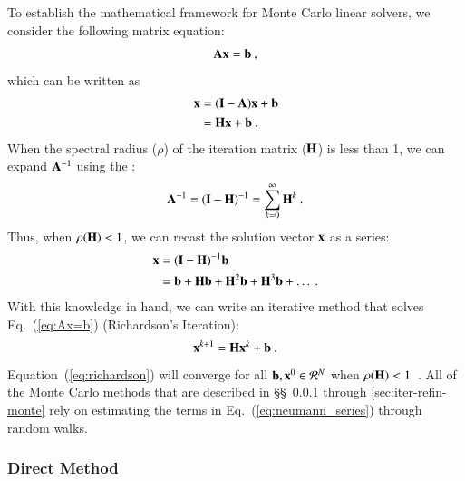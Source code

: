 \documentclass[preprint,12pt]{elsarticle}
\newcommand{\vA}{\ensuremath{\ve{A}}}
\newcommand{\vb}{\ensuremath{\ve{b}}}
\newcommand{\vx}{\ensuremath{\ve{x}}}
\newcommand{\vI}{\ensuremath{\ve{I}}}
\newcommand{\vH}{\ensuremath{\ve{H}}}
\begin{document}
To establish the mathematical framework for Monte Carlo linear
solvers, we consider the following matrix equation:
\begin{equation}
  \vA\vx = \vb\:,
  \label{eq:Ax=b}
\end{equation}
which can be written as
\begin{equation}
  \begin{split}
    \vx &= (\vI - \vA)\vx + \vb\\ &= \vH\vx + \vb\:.
  \end{split}
  \label{eq:point_iteration}
\end{equation}
When the spectral radius ($\rho$) of the iteration matrix ($\vH$) is
less than 1, we can expand $\vA^{-1}$ using the :
\begin{equation}
  \vA^{-1} = (\vI - \vH)^{-1} = \sum_{k=0}^{\infty} \vH^k\:.
\end{equation} 
Thus, when $\rho(\vH) < 1$, we can recast the solution vector $\vx$ as
a series:
\begin{equation}
  \begin{split}
    \vx &= (\vI - \vH)^{-1}\vb\\ &= \vb + \vH\vb + \vH^2\vb + \vH^3\vb
    + \ldots\:.
    \label{eq:neumann_series}
  \end{split}
\end{equation}
With this knowledge in hand, we can write an iterative method that
solves Eq.~(\ref{eq:Ax=b}) (Richardson's Iteration):
\begin{equation}
  \vx^{k+1} = \vH\vx^k + \vb\:.
  \label{eq:richardson}
\end{equation}
Equation~(\ref{eq:richardson}) will converge for all $\vb,\vx^0 \in
\mathcal{R}^{N}$ when $\rho(\vH) < 1$~\cite{kelley_1995}.  All of the Monte
Carlo methods that are described in \S\S~\ref{sec:direct-method} through
\ref{sec:iter-refin-monte} rely on estimating the terms in
Eq.~(\ref{eq:neumann_series}) through random walks.

\subsubsection{Direct Method}
\label{sec:direct-method}
\end{document}
